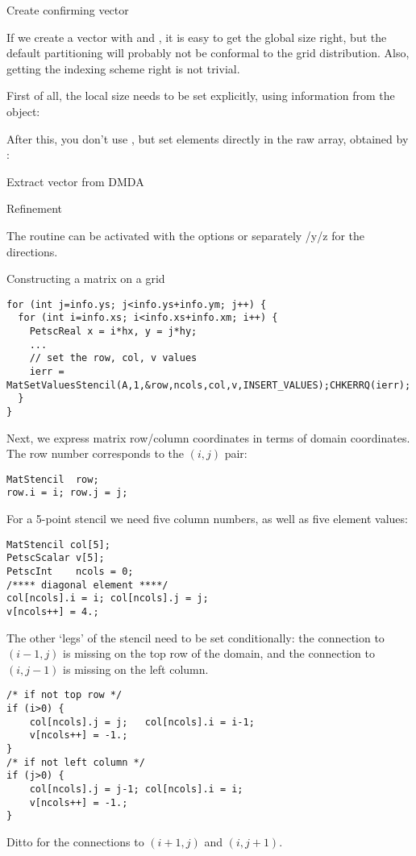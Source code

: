  {Create confirming vector}

If we create a vector with  and ,
it is easy to get the global size right, but the default partitioning will
probably not be conformal to the grid distribution.
Also, getting the indexing scheme right is not trivial.

First of all, the local size needs to be set explicitly,
using information from the  object:
%

After this, you don't use , but
set elements directly in the raw array, obtained by :
%

 {Extract vector from DMDA}

 {Refinement}

The routine 
can be activated with the options 
or separately /y/z for the directions.

 {Constructing a matrix on a grid}

\begin{lstlisting}
for (int j=info.ys; j<info.ys+info.ym; j++) {
  for (int i=info.xs; i<info.xs+info.xm; i++) {
    PetscReal x = i*hx, y = j*hy;
    ...
    // set the row, col, v values
    ierr = MatSetValuesStencil(A,1,&row,ncols,col,v,INSERT_VALUES);CHKERRQ(ierr);
  }
}
\end{lstlisting}

Next, we express matrix row/column coordinates in terms of domain coordinates.
The row number corresponds to the $(i,j)$ pair:
\begin{lstlisting}
MatStencil  row;
row.i = i; row.j = j; 
\end{lstlisting}
For a 5-point stencil we need five column numbers,
as well as five element values:
\begin{lstlisting}
MatStencil col[5];
PetscScalar v[5];
PetscInt    ncols = 0;
/**** diagonal element ****/
col[ncols].i = i; col[ncols].j = j;
v[ncols++] = 4.;
\end{lstlisting}

The other `legs' of the stencil need to be set conditionally:
the connection to $(i-1,j)$ is missing on the top row of the domain,
and the connection to $(i,j-1)$ is missing on the left column.
\begin{lstlisting}
/* if not top row */
if (i>0) {
    col[ncols].j = j;   col[ncols].i = i-1;
    v[ncols++] = -1.;
}
/* if not left column */
if (j>0) {
    col[ncols].j = j-1; col[ncols].i = i;
    v[ncols++] = -1.;
}
\end{lstlisting}
Ditto for the connections to $(i+1,j)$ and $(i,j+1)$.

